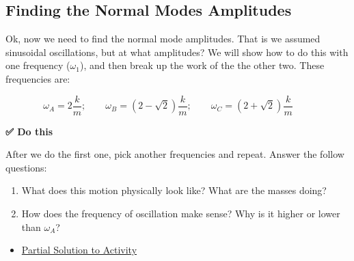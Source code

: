 \subsection{Finding the Normal Modes
Amplitudes}\label{finding-the-normal-modes-amplitudes}

Ok, now we need to find the normal mode amplitudes. That is we assumed
sinusoidal oscillations, but at what amplitudes? We will show how to do
this with one frequency (\(\omega_1\)), and then break up the work of
the the other two. These frequencies are:

\[\omega_A = 2\dfrac{k}{m}; \qquad \omega_B = \left(2-\sqrt{2}\right)\dfrac{k}{m}; \qquad \omega_C = \left(2+\sqrt{2}\right)\dfrac{k}{m}\qquad\]

\textbf{✅ Do this}

After we do the first one, pick another frequencies and repeat. Answer
the follow questions:

\begin{enumerate}
\def\labelenumi{\arabic{enumi}.}
\tightlist
\item
  What does this motion physically look like? What are the masses doing?
\item
  How does the frequency of oscillation make sense? Why is it higher or
  lower than \(\omega_A\)?
\end{enumerate}

\begin{itemize}
\tightlist
\item
  \href{../assets/notes/Notes-Three_Coupled_Oscillators.pdf}{Partial
  Solution to Activity}
\end{itemize}
